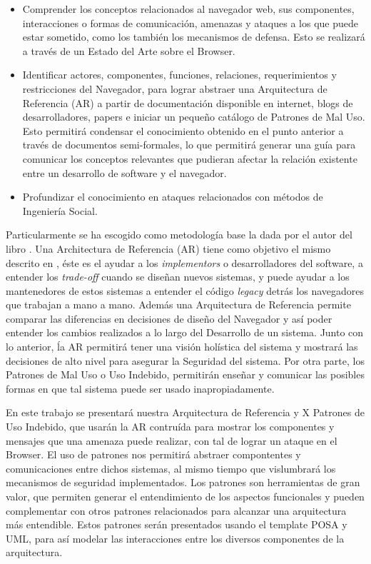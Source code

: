 \begin{itemize}
	\item Comprender los conceptos relacionados al navegador web, sus componentes, interacciones o formas de comunicación, amenazas y ataques a los que puede estar sometido, como los también los mecanismos de defensa. Esto se realizará a través de un Estado del Arte sobre el Browser.
	\item Identificar actores, componentes, funciones, relaciones, requerimientos y restricciones del Navegador, para lograr abstraer una Arquitectura de Referencia (AR) a partir de documentación disponible en internet, blogs de desarrolladores, papers e iniciar un pequeño catálogo de Patrones de Mal Uso. Esto permitirá condensar el conocimiento obtenido en el punto anterior a través de documentos semi-formales, lo que permitirá generar una guía para comunicar los conceptos relevantes que pudieran afectar la relación existente entre un desarrollo de software y el navegador.
	\item Profundizar el conocimiento en ataques relacionados con métodos de Ingeniería Social.
	
\end{itemize} 

Particularmente se ha escogido como metodología base la dada por el autor del libro \cite{fernandez2013security}. Una Architectura de Referencia (AR) tiene como objetivo el mismo descrito en \cite{2005-grosskurth-browser-refarch, preprint-grosskurth-browser-archevol, Avgeriou2003}, éste es el ayudar a los \textit{implementors} o desarrolladores del software, a entender los \textit{trade-off} cuando se diseñan nuevos sistemas, y puede ayudar a los mantenedores de estos sistemas a entender el código \textit{legacy} detrás los navegadores que trabajan a mano a mano. Además una Arquitectura de Referencia permite comparar las diferencias en decisiones de diseño del Navegador y así poder entender los cambios realizados a lo largo del Desarrollo de un sistema. Junto con lo anterior, ĺa AR permitirá tener una visión holística del sistema y mostrará las decisiones de alto nivel para asegurar la Seguridad del sistema. Por otra parte, los Patrones de Mal Uso o Uso Indebido, permitirán enseñar y comunicar las posibles formas en que tal sistema puede ser usado inapropiadamente.


En este trabajo se presentará nuestra Arquitectura de Referencia y X Patrones de Uso Indebido, que usarán la AR contruída para mostrar los componentes y mensajes que una amenaza puede realizar, con tal de lograr un ataque en el Browser. El uso de patrones nos permitirá abstraer compontentes y comunicaciones entre dichos sistemas, al mismo tiempo que vislumbrará los mecanismos de seguridad implementados. Los patrones son herramientas de gran valor, que permiten generar el entendimiento de los aspectos funcionales y pueden complementar con otros patrones relacionados para alcanzar una arquitectura más entendible. Estos patrones serán presentados usando el template POSA \cite{buschman1996system} y UML, para así modelar las interacciones entre los diversos componentes de la arquitectura.

